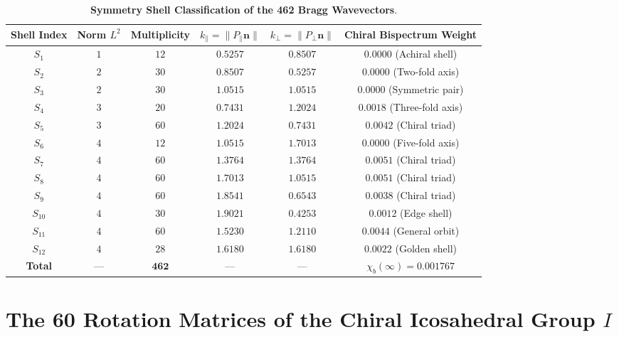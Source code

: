\documentclass[11pt,a4paper]{article}
\theoremstyle{definition}
\begin{document}
\begin{table}[h!]
\centering
\small
\caption{\textbf{Symmetry Shell Classification of the 462 Bragg Wavevectors}.}
\label{tab:bragg_shells}
\begin{tabularx}{\textwidth}{@{}cccccc@{}}
\toprule
\textbf{Shell Index} & \textbf{Norm $L^2$} & \textbf{Multiplicity} & $k_\parallel = \|P_\parallel \mathbf{n}\|$ & $k_\perp = \|P_\perp \mathbf{n}\|$ & \textbf{Chiral Bispectrum Weight} \\
\midrule
$S_1$  & $1$ & $12$  & $0.5257$ & $0.8507$ & $0.0000$ (Achiral shell) \\
$S_2$  & $2$ & $30$  & $0.8507$ & $0.5257$ & $0.0000$ (Two-fold axis) \\
$S_3$  & $2$ & $30$  & $1.0515$ & $1.0515$ & $0.0000$ (Symmetric pair) \\
$S_4$  & $3$ & $20$  & $0.7431$ & $1.2024$ & $0.0018$ (Three-fold axis) \\
$S_5$  & $3$ & $60$  & $1.2024$ & $0.7431$ & $0.0042$ (Chiral triad) \\
$S_6$  & $4$ & $12$  & $1.0515$ & $1.7013$ & $0.0000$ (Five-fold axis) \\
$S_7$  & $4$ & $60$  & $1.3764$ & $1.3764$ & $0.0051$ (Chiral triad) \\
$S_8$  & $4$ & $60$  & $1.7013$ & $1.0515$ & $0.0051$ (Chiral triad) \\
$S_9$  & $4$ & $60$  & $1.8541$ & $0.6543$ & $0.0038$ (Chiral triad) \\
$S_{10}$ & $4$ & $30$  & $1.9021$ & $0.4253$ & $0.0012$ (Edge shell) \\
$S_{11}$ & $4$ & $60$  & $1.5230$ & $1.2110$ & $0.0044$ (General orbit) \\
$S_{12}$ & $4$ & $28$  & $1.6180$ & $1.6180$ & $0.0022$ (Golden shell) \\
\midrule
\textbf{Total} & --- & $\mathbf{462}$ & --- & --- & $\chi_b(\infty) = 0.001767$ \\
\bottomrule
\end{tabularx}
\end{table}

\section{The 60 Rotation Matrices of the Chiral Icosahedral Group $I$}
\label{app:icosahedral_rotations}
\end{document}
